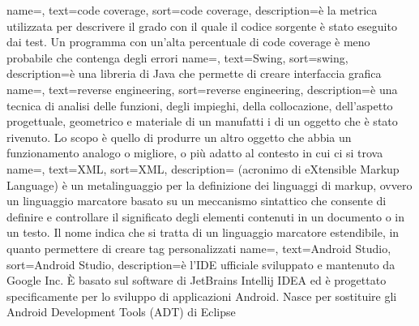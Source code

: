 {
name=,
text=code coverage,
sort=code coverage,
description={è la metrica utilizzata per descrivere il grado con il quale il codice sorgente è stato eseguito dai test.
Un programma con un'alta percentuale di code coverage è meno probabile che contenga degli errori}
}
{
name=,
text=Swing,
sort=swing,
description={è una libreria di Java che permette di creare interfaccia grafica}
}
{
name=,
text=reverse engineering,
sort=reverse engineering,
description={è una tecnica di analisi delle funzioni, degli impieghi, della collocazione, dell'aspetto progettuale, geometrico e materiale di un manufatti i di un oggetto che è stato rivenuto.
Lo scopo è quello di produrre un altro oggetto che abbia un funzionamento analogo o migliore, o più adatto al contesto in cui ci si trova}
}
{
name=,
text=XML,
sort=XML,
description={ (acronimo di eXtensible Markup Language) è un metalinguaggio per la definizione dei linguaggi di markup, ovvero un linguaggio marcatore basato su un meccanismo sintattico che consente di definire e controllare il significato degli elementi contenuti in un documento o in un testo.
Il nome indica che si tratta di un linguaggio marcatore estendibile, in quanto permettere di creare tag personalizzati}
}
{
    name=,
    text=Android Studio,
    sort=Android Studio,
    description={è l'IDE ufficiale sviluppato e mantenuto da Google Inc.
\`{E} basato sul software di JetBrains Intellij IDEA ed è progettato specificamente per lo sviluppo di applicazioni Android.
Nasce per sostituire gli Android Development Tools (ADT) di Eclipse}
}
